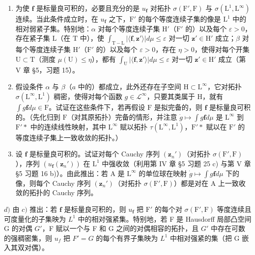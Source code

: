 \begin{enumerate}
\def\labelenumi{\alph{enumi})}
\item
  为使 \(\mathbf{f}\) 是标量良可积的，必要且充分的是 \(u_{\mathbf{f}}\) 对拓扑 \(\sigma(\mathrm{F}',\mathrm{F})\) 与 \(\sigma(\mathrm{L}^1,\mathrm{L}^\infty)\) 连续。当此条件成立时，在 \(u_{\mathbf{f}}\) 之下，\(\mathrm{F}'\) 的每个等度连续子集的像是 \(\mathrm{L}^1\) 中的相对弱紧子集。特别地：\(\alpha\) 对每个等度连续子集 \(\mathrm{H}'\)（\(\mathrm{F}'\) 的）以及每个 \(\varepsilon >0\)，存在紧子集 \(\mathrm{L}\)（在 \(\mathrm{T}\) 中），使 \(\int_{\mathrm{T}-\mathrm{L}}|\langle\mathbf{f},\mathbf{z}'\rangle|d\mu\leqslant\varepsilon\) 对一切 \(\mathbf{z}'\in\mathrm{H}'\) 成立；\(\beta\) 对每个等度连续子集 \(\mathrm{H}'\)（\(\mathrm{F}'\) 的）以及每个 \(\varepsilon>0\)，存在 \(\eta>0\)，使得对每个开集 \(\mathrm{U}\subset\mathrm{T}\)（测度 \(\mu(\mathrm{U})\leqslant\eta\)），都有 \(\int_{\mathrm{U}}|\langle\mathbf{f},\mathbf{z}'\rangle|d\mu\leqslant\varepsilon\) 对一切 \(\mathbf{z}'\in\mathrm{H}'\) 成立（第 V 章 §5，习题 15）。
\item
  假设条件 \(\alpha\) 与 \(\beta\)（\(a\) 中的）都成立，此外还存在子空间 \(\mathrm{H} \subset \mathrm{L}^{\infty}\)，它对拓扑 \(\sigma(\mathrm{L}^{\infty}, \mathrm{L}^{1})\) 稠密，使得对每个函数 \(g \in \mathcal{L}^{\infty}\)，只要其类属于 \(\mathrm{H}\)，就有 \(\int g\mathbf{f}d\mu \in \mathrm{F}\)。试证在这些条件下，若再假设 \(\mathrm{F}\) 是拟完备的，则 \(\mathbf{f}\) 是标量良可积的。（先化归到 \(\mathrm{F}\)（对其原拓扑）完备的情形，并注意 \(\dot{g} \mapsto \int g\mathbf{f}d\mu\) 是 \(\mathrm{L}^{\infty}\) 到 \(\mathrm{F}'*\) 中的连续线性映射，其中 \(\mathrm{L}^{\infty}\) 赋以拓扑 \(\tau(\mathrm{L}^{\infty}, \mathrm{L}^{1})\)，\(\mathrm{F}'*\) 赋以在 \(\mathrm{F}'\) 的等度连续子集上一致收敛的拓扑。）
\item
  设 \(\mathbf{f}\) 是标量良可积的。试证对每个 Cauchy 序列 \((\mathbf{z}_n')\)（对拓扑 \(\sigma(\mathrm{F}',\mathrm{F})\)），序列 \((u_{\mathbf{f}}(\mathbf{z}_n'))\) 在 \(\mathrm{L}^1\) 中强收敛（利用第 IV 章 §5 习题 25 c) 与第 V 章 §5 习题 16 b)）。由此推出：若 A 是 \(\mathrm{L}^{\infty}\) 的单位球在映射 \(\dot{g} \mapsto \int g\mathbf{f}d\mu\) 下的像，则每个 Cauchy 序列 \((\mathbf{z}_n')\)（对拓扑 \(\sigma(\mathrm{F}',\mathrm{F})\)）都是对在 A 上一致收敛的拓扑的 Cauchy 序列。
\end{enumerate}

\(d)\) 由 \(c)\) 推出：若 \(\mathbf{f}\) 是标量良可积的，则 \(u_{\mathbf{f}}\) 把 \(\mathrm{F}'\) 的每个对 \(\sigma (\mathrm{F}',\mathrm{F})\) 等度连续且可度量化的子集映为 \(L^{1}\) 中的相对强紧集。特别地，若 F 是 Hausdorff 局部凸空间 G 的对偶 \(G'\)，F 赋以一个与 F 和 G 之间的对偶相容的拓扑，且 \(G'\) 中存在可数的强稠密集，则 \(u_{f}\) 把 \(F' = G\) 的每个有界子集映为 \(L^{1}\) 中相对强紧的集（把 G 嵌入其双对偶）。

